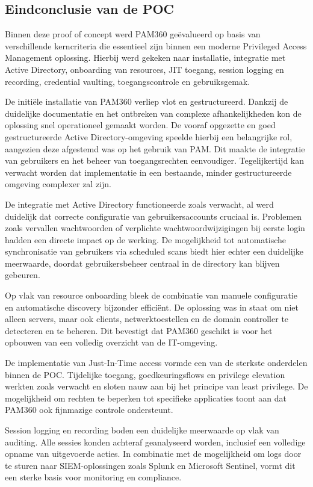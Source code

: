\subsection{Eindconclusie van de POC}

Binnen deze proof of concept werd PAM360 geëvalueerd op basis van verschillende kerncriteria die essentieel zijn binnen een moderne Privileged Access Management oplossing. Hierbij werd gekeken naar installatie, integratie met Active Directory, onboarding van resources, JIT toegang, session logging en recording, credential vaulting, toegangscontrole en gebruiksgemak.

De initiële installatie van PAM360 verliep vlot en gestructureerd. Dankzij de duidelijke documentatie en het ontbreken van complexe afhankelijkheden kon de oplossing snel operationeel gemaakt worden. De vooraf opgezette en goed gestructureerde Active Directory-omgeving speelde hierbij een belangrijke rol, aangezien deze afgestemd was op het gebruik van PAM. Dit maakte de integratie van gebruikers en het beheer van toegangsrechten eenvoudiger. Tegelijkertijd kan verwacht worden dat implementatie in een bestaande, minder gestructureerde omgeving complexer zal zijn.

De integratie met Active Directory functioneerde zoals verwacht, al werd duidelijk dat correcte configuratie van gebruikersaccounts cruciaal is. Problemen zoals vervallen wachtwoorden of verplichte wachtwoordwijzigingen bij eerste login hadden een directe impact op de werking. De mogelijkheid tot automatische synchronisatie van gebruikers via scheduled scans biedt hier echter een duidelijke meerwaarde, doordat gebruikersbeheer centraal in de directory kan blijven gebeuren.

Op vlak van resource onboarding bleek de combinatie van manuele configuratie en automatische discovery bijzonder efficiënt. De oplossing was in staat om niet alleen servers, maar ook clients, netwerktoestellen en de domain controller te detecteren en te beheren. Dit bevestigt dat PAM360 geschikt is voor het opbouwen van een volledig overzicht van de IT-omgeving.

De implementatie van Just-In-Time access vormde een van de sterkste onderdelen binnen de POC. Tijdelijke toegang, goedkeuringsflows en privilege elevation werkten zoals verwacht en sloten nauw aan bij het principe van least privilege. De mogelijkheid om rechten te beperken tot specifieke applicaties toont aan dat PAM360 ook fijnmazige controle ondersteunt.

Session logging en recording boden een duidelijke meerwaarde op vlak van auditing. Alle sessies konden achteraf geanalyseerd worden, inclusief een volledige opname van uitgevoerde acties. In combinatie met de mogelijkheid om logs door te sturen naar SIEM-oplossingen zoals Splunk en Microsoft Sentinel, vormt dit een sterke basis voor monitoring en compliance.

